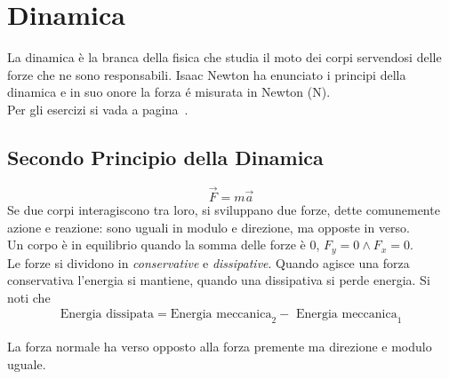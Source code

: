 
\section{Dinamica}\label{sec:dinamica}
La dinamica è la branca della fisica che studia il moto dei corpi servendosi delle forze che ne
sono responsabili. Isaac Newton ha enunciato i principi della dinamica e in suo onore la forza é 
  misurata in Newton (N).\\
Per gli esercizi si vada a pagina~\pageref{ex:dinamica}.
\subsection{Secondo Principio della Dinamica}
\begin{equation*}
\vec{F} = m\vec{a}
\end{equation*}
Se due corpi interagiscono tra loro, si sviluppano due forze, dette comunemente azione e reazione: 
sono uguali in modulo e direzione, ma opposte in verso.\\
Un corpo è in equilibrio quando la somma delle forze è 0, $F_y = 0\land F_x = 0$.\\
Le forze si dividono in \emph{conservative} e \emph{dissipative}. Quando agisce una forza conservativa
l'energia si mantiene, quando una dissipativa si perde energia. Si noti che
\begin{align*}
  \text{Energia dissipata} =
  \text{Energia meccanica}_2 - \text{ Energia meccanica}_1
\end{align*}

\begin{center}
\end{center}
La forza normale ha verso opposto alla forza premente ma direzione e modulo uguale.

